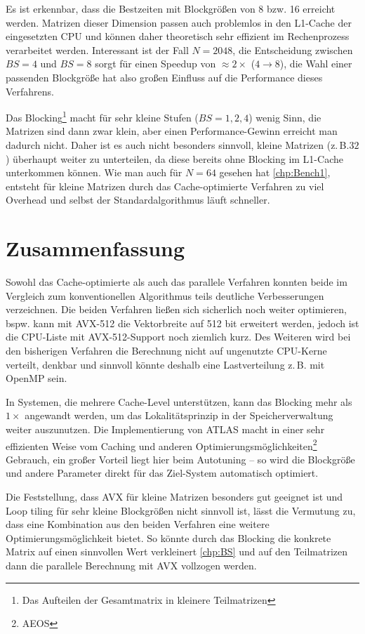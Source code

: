 \documentclass[a4paper,11pt]{scrartcl}
\newcommand{\zB}{\mbox{z.\,B.}\xspace}
\newcommand{\bspw}{\mbox{bspw.}\xspace}
\newcommand{\bzw}{\mbox{bzw.}\xspace}
\begin{document}
Es ist erkennbar, dass die Bestzeiten mit Blockgrößen von 8 \bzw 16 erreicht werden.
Matrizen dieser Dimension passen auch problemlos in den L1-Cache der eingesetzten CPU
und können daher theoretisch sehr effizient im Rechenprozess verarbeitet werden.
Interessant ist der Fall $N=2048$, die Entscheidung zwischen $BS=4$ und $BS=8$
sorgt für einen Speedup von $\approx 2\times$ ($4\rightarrow8$), die Wahl einer
passenden Blockgröße hat also großen Einfluss auf die Performance dieses Verfahrens.
\newline

Das Blocking\footnote{Das Aufteilen der Gesamtmatrix in kleinere Teilmatrizen} macht für
sehr kleine Stufen ($BS=1,2,4$)  wenig Sinn, die Matrizen sind dann zwar klein, aber
einen Performance-Gewinn erreicht man dadurch nicht. Daher ist es auch nicht besonders sinnvoll,
kleine Matrizen (\zB $32$) überhaupt weiter zu unterteilen, da diese bereits ohne Blocking
im L1-Cache unterkommen können. Wie man auch für $N=64$ gesehen hat \ref{chp:Bench1}, 
entsteht für kleine 
Matrizen durch das Cache-optimierte Verfahren zu viel Overhead und selbst der
Standardalgorithmus läuft schneller.

\section{Zusammenfassung}
Sowohl das Cache-optimierte als auch das parallele Verfahren konnten beide
im Vergleich zum konventionellen Algorithmus teils deutliche Verbesserungen verzeichnen.
Die beiden Verfahren ließen sich sicherlich noch weiter optimieren, \bspw
kann mit AVX-512 die Vektorbreite auf 512 bit erweitert werden, jedoch ist die
CPU-Liste mit AVX-512-Support noch ziemlich kurz. Des Weiteren wird bei den bisherigen Verfahren
die Berechnung nicht auf ungenutzte CPU-Kerne verteilt, denkbar und sinnvoll könnte
deshalb eine Lastverteilung \zB mit OpenMP sein.\newline
 
In Systemen, die mehrere Cache-Level unterstützen, kann das Blocking mehr als $1\times$ angewandt werden,
um das Lokalitätsprinzip in der Speicherverwaltung weiter auszunutzen.
Die Implementierung von ATLAS macht in einer sehr effizienten Weise vom Caching 
und anderen Optimierungsmöglichkeiten\footnote{AEOS} Gebrauch, ein großer Vorteil
liegt hier beim Autotuning -- so wird die Blockgröße und andere Parameter direkt für das 
Ziel-System automatisch optimiert.\newline

Die Feststellung, dass AVX für kleine Matrizen besonders gut geeignet ist und 
Loop tiling für sehr kleine Blockgrößen nicht sinnvoll ist, lässt die Vermutung zu,
dass eine Kombination aus den beiden Verfahren eine weitere Optimierungsmöglichkeit 
bietet. So könnte durch das Blocking die konkrete Matrix auf einen sinnvollen Wert verkleinert
 \ref{chp:BS} und auf den Teilmatrizen dann die parallele Berechnung mit AVX vollzogen werden.
\end{document}
